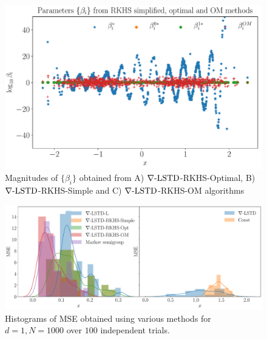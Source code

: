 \begin{figure}
	\centering
	\includegraphics[width=5in]{images/Chap4_beta_comparison}
	\caption[Parameter magnitudes comparison]{Magnitudes of $\{\beta_i\}$ obtained from A) $\nabla\text{-LSTD}$-RKHS-Optimal, B) $\nabla\text{-LSTD}$-RKHS-Simple and C) $\nabla\text{-LSTD}$-RKHS-OM algorithms}
	\label{fig:beta_comparison}
\end{figure}

\begin{figure}
	\centering
	\includegraphics[width=6in]{images/Chap4_hist_mse_d1_runs100}
	\caption[Histograms of MSEs obtained over $100$ trials]{Histograms of MSE obtained using various methods for $d=1,N=1000$ over $100$ independent trials.}
	\label{fig:hist_mse}
\end{figure}

